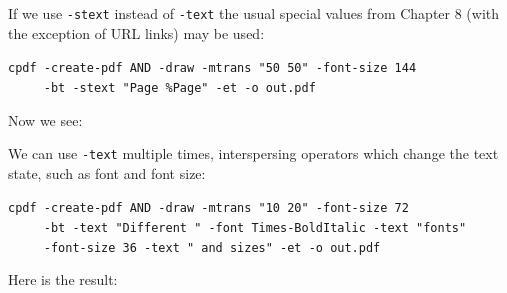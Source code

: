 \documentclass{book}
\begin{document}
\noindent If we use \texttt{-stext} instead of \texttt{-text} the usual special values from Chapter 8 (with the exception of URL links) may be used:

\begin{framed}
 \noindent\small\verb?cpdf -create-pdf AND -draw -mtrans "50 50" -font-size 144?\\
 \noindent\small\verb?     -bt -stext "Page %Page" -et -o out.pdf?
\end{framed}

\noindent Now we see:

\bigskip
{}
\bigskip

\noindent We can use \texttt{-text} multiple times, interspersing operators which change the text state, such as font and font size:

\begin{framed}
 \noindent\small\verb?cpdf -create-pdf AND -draw -mtrans "10 20" -font-size 72?\\
 \noindent\small\verb?     -bt -text "Different " -font Times-BoldItalic -text "fonts"?\\
 \noindent\small\verb?     -font-size 36 -text " and sizes" -et -o out.pdf?
\end{framed}

\noindent Here is the result:

\bigskip
{}
\bigskip
\end{document}
